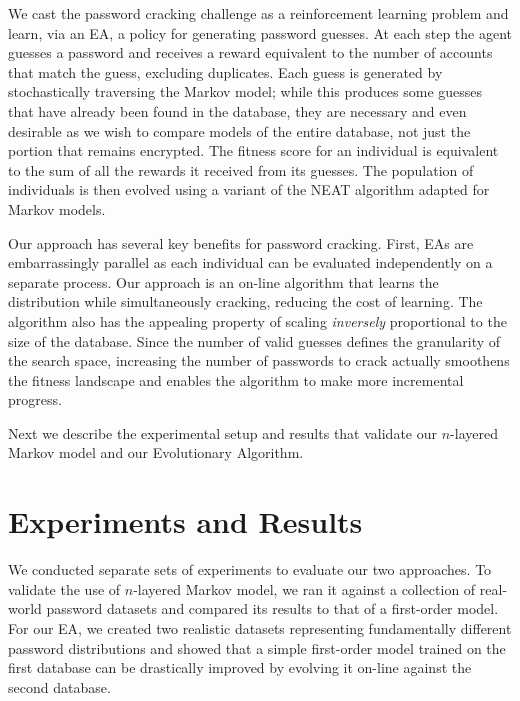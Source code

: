 \documentclass{acm_proc_article-sp}
\begin{document}
We cast the password cracking challenge as a reinforcement learning problem and learn, via an EA, a policy for generating password guesses. At each step the agent guesses a password and receives a reward equivalent to the number of accounts that match the guess, excluding duplicates. Each guess is generated by stochastically traversing the Markov model; while this produces some guesses that have already been found in the database, they are necessary and even desirable as we wish to compare models of the entire database, not just the portion that remains encrypted. The fitness score for an individual is equivalent to the sum of all the rewards it received from its guesses. The population of individuals is then evolved using a variant of the NEAT algorithm \cite{stanley-ec02} adapted for Markov models.

Our approach has several key benefits for password cracking. First, EAs are embarrassingly parallel as each individual can be evaluated independently on a separate process. Our approach is an on-line algorithm that learns the distribution while simultaneously cracking, reducing the cost of learning. The algorithm also has the appealing property of scaling \textit{inversely} proportional to the size of the database. Since the number of valid guesses defines the granularity of the search space, increasing the number of passwords to crack actually smoothens the fitness landscape and enables the algorithm to make more incremental progress.

Next we describe the experimental setup and results that validate our $n$-layered Markov model and our Evolutionary Algorithm.

\section{Experiments and Results}
\label{sec:results}

We conducted separate sets of experiments to evaluate our two approaches. To validate the use of $n$-layered Markov model, we ran it against a collection of real-world password datasets and compared its results to that of a first-order model. For our EA, we created two realistic datasets representing fundamentally different password distributions and showed that a simple first-order model trained on the first database can be drastically improved by evolving it on-line against the second database.
\end{document}
